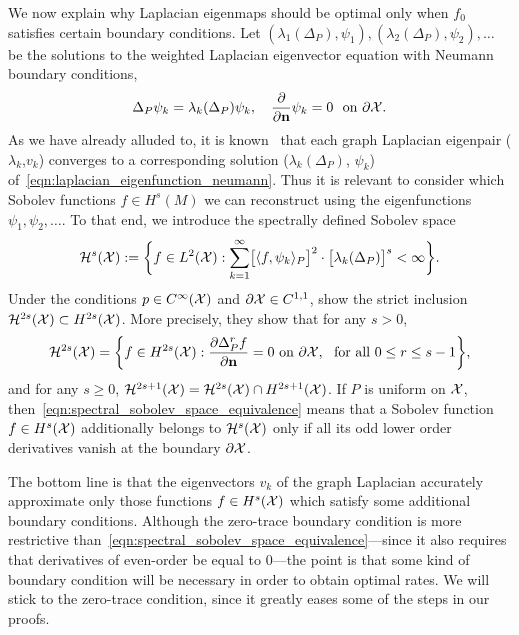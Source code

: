 We now explain why Laplacian eigenmaps should be optimal only when $f_0$ satisfies certain boundary conditions. Let $(\lambda_1(\Delta_P),\psi_1),(\lambda_2(\Delta_P),\psi_2),\ldots$ be the solutions to the weighted Laplacian eigenvector equation with Neumann boundary conditions, 
\begin{equation}
\label{eqn:laplacian_eigenfunction_neumann}
\Delta_P\psi_k = \lambda_{k}(\Delta_P) \psi_k, \quad \frac{\partial}{\partial {\bf n}}\psi_k = 0~~\textrm{on $\partial \mathcal{X}$}.
\end{equation}
As we have already alluded to, it is known~\citep{garciatrillos18} that each graph Laplacian eigenpair ($\lambda_k$,$v_k$) converges to a corresponding solution ($\lambda_k(\Delta_P)$, $\psi_k$) of~\eqref{eqn:laplacian_eigenfunction_neumann}. Thus it is relevant to consider which Sobolev functions $f \in H^s(M)$ we can reconstruct using the eigenfunctions $\psi_1,\psi_2,\ldots$. To that end, we introduce the spectrally defined Sobolev space
\begin{equation}
\label{eqn:spectral_sobolev_space}
\mathcal{H}^s(\mathcal{X}) := \biggl\{f \in L^2(\mathcal{X}): \sum_{k = 1}^{\infty} \bigl[\langle f, \psi_k \rangle_P\bigr]^2 \cdot\bigl[\lambda_k(\Delta_P)\bigr]^s < \infty \biggr\}.
\end{equation}
Under the conditions $p \in C^{\infty}(\mathcal{X})$ and $\partial\mathcal{X} \in C^{1,1}$, \cite{dunlop2020} show the strict inclusion $\mathcal{H}^{2s}(\mathcal{X}) \subset H^{2s}(\mathcal{X})$. More precisely, they show that for any $s > 0$,
\begin{equation}
\label{eqn:spectral_sobolev_space_equivalence}
\mathcal{H}^{2s}(\mathcal{X}) = \biggl\{f \in H^{2s}(\mathcal{X}): \frac{\partial \Delta_P^rf}{\partial {\bf n}} = 0~\textrm{on}~\partial\mathcal{X},~~\textrm{for all $0 \leq r \leq s - 1$} \biggr\},
\end{equation}
and for any $s \geq 0$, $\mathcal{H}^{2s + 1}(\mathcal{X}) = \mathcal{H}^{2s}(\mathcal{X}) \cap H^{2s + 1}(\mathcal{X})$. If $P$ is uniform on $\mathcal{X}$, then~\eqref{eqn:spectral_sobolev_space_equivalence} means that a Sobolev function $f \in H^{s}(\mathcal{X})$ additionally belongs to $\mathcal{H}^{s}(\mathcal{X})$ only if all its odd lower order derivatives vanish at the boundary $\partial\mathcal{X}$.

The bottom line is that the eigenvectors $v_k$ of the graph Laplacian accurately approximate only those functions $f \in H^{s}(\mathcal{X})$ which satisfy some additional boundary conditions. Although the zero-trace boundary condition is more restrictive than~\eqref{eqn:spectral_sobolev_space_equivalence}---since it also requires that derivatives of even-order be equal to $0$---the point is that some kind of boundary condition will be necessary in order to obtain optimal rates. We will stick to the zero-trace condition, since it greatly eases some of the steps in our proofs.

